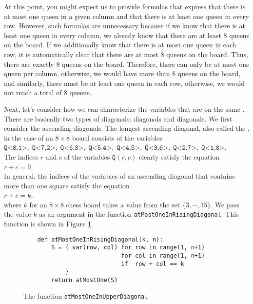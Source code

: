 At this point, you might expect us to provide formulas that express that there is at most one queen in a given column and that there is at least one queen in every row.
However, such formulas are unnecessary because if we know that there is at least one queen in every column, we already know that there are at least 8 queens on the board.
If we additionally know that there is at most one queen in each row, it is automatically clear that there are at most 8 queens on the board. Thus, there are exactly
8 queens on the board. Therefore, there can only be at most one queen per column, otherwise, we would have more than 8 queens on the board, and similarly, there must be at least one queen in each row, otherwise, we would not reach a total of 8 queens.

Next, let's consider how we can characterize the variables that are on the same .
There are basically two types of diagonals:  diagonals and  diagonals. We first consider
the ascending diagonals. The longest ascending diagonal, also called the
, in the case of an $8 \times 8$ board consists of the
variables \\[0.2cm]
\hspace*{1.3cm} 
$\texttt{Q<8,1>},\; \texttt{Q<7,2>},\; \texttt{Q<6,3>},\; \texttt{Q<5,4>},\; \texttt{Q<4,5>},\; \texttt{Q<3,6>},\; 
 \texttt{Q<2,7>},\; \texttt{Q<1,8>}$.
\\[0.2cm]
The indices $r$ and $c$ of the variables $\texttt{Q}(r,c)$ clearly satisfy
the equation \\[0.2cm]
\hspace*{1.3cm} $r + c = 9$. \\[0.2cm]
In general, the indices of the variables of an ascending diagonal that contains more than one square satisfy the
equation \\[0.2cm] 
\hspace*{1.3cm} $r + c = k$, \\[0.2cm]
where $k$ for an $8 \times 8$ chess board takes a value from the set $\{3, \cdots, 15 \}$. We pass the value $k$ as an argument in the
function \texttt{atMostOneInRisingDiagonal}. This function is shown in Figure
\ref{fig:atMostOneInUpperDiagonal}.


\begin{figure}[!ht]
  \centering
\begin{verbatim}
    def atMostOneInRisingDiagonal(k, n):
        S = { var(row, col) for row in range(1, n+1)
                            for col in range(1, n+1) 
                            if  row + col == k 
            }
        return atMostOne(S)
\end{verbatim}
\vspace*{-0.3cm}
  \caption{The function \texttt{atMostOneInUpperDiagonal}}
  \label{fig:atMostOneInUpperDiagonal}
\end{figure}

